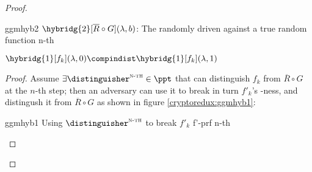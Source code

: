\begin{proof}
\begin{cryptogame}

    \end{cryptogame}

    \begin{cryptogame}
        {ggmhyb2}
        {$\hybridg{2}[\overline{R} \circ G](\lambda, b)$: The randomly driven \prg{} against a true random function}
        {n-th}


        \cseqdelay
        \cseqbeginloop
        \cseqendloop
        \cseqdelay


    \end{cryptogame}
    

    \begin{lemma}
        $\hybridg{1}[f_k](\lambda, 0) \compindist \hybridg{1}[f_k](\lambda, 1)$       
    \end{lemma}

    \begin{proof}
        Assume $\exists \distinguisher^{\textsc{n-th}} \in \ppt$ that can distinguish $f_k$ from $\overline{R} \circ G$ at the $n$-th step; then an adversary \adversary{} can use it to break in turn $f'_k$'s \prf-ness, and distingush it from $\overline{R} \circ G$ as shown in figure \ref{cryptoredux:ggmhyb1}:

        \begin{cryptoredux}
            {ggmhyb1}
            {Using $\distinguisher^{\textsc{n-th}}$ to break $f'_k$}
            {f'-prf}
            {n-th}


\end{cryptoredux}
\end{proof}
\end{proof}
